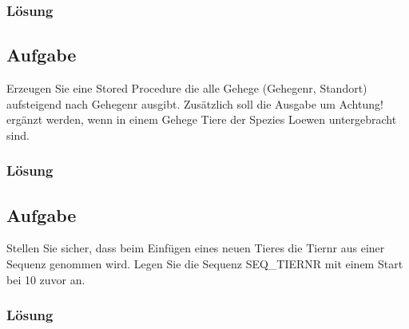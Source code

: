 \subsubsection*{Lösung}
\label{subsubsec:uebung_01.aufgabe_6.loesung}


\subsection{Aufgabe}
\label{subsec:uebung_01.aufgabe_07}
Erzeugen Sie eine Stored Procedure die alle Gehege (Gehegenr, Standort) aufsteigend nach Gehegenr ausgibt. Zusätzlich soll die Ausgabe um Achtung! ergänzt werden, wenn in einem Gehege Tiere der Spezies Loewen untergebracht sind.

\subsubsection*{Lösung}
\label{subsubsec:uebung_01.aufgabe_7.loesung}


\subsection{Aufgabe}
\label{subsec:uebung_01.aufgabe_08}
Stellen Sie sicher, dass beim Einfügen eines neuen Tieres die Tiernr aus einer Sequenz genommen wird. Legen Sie die Sequenz SEQ\_TIERNR mit einem Start bei 10 zuvor an.

\subsubsection*{Lösung}
\label{subsubsec:uebung_01.aufgabe_8.loesung}


